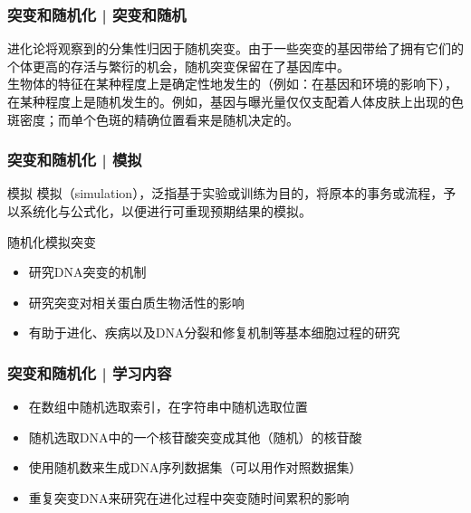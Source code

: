 \begin{frame}
  \frametitle{突变和随机化 | 突变和随机}
  进化论将观察到的分集性归因于随机突变。由于一些突变的基因带给了拥有它们的个体更高的存活与繁衍的机会，随机突变保留在了基因库中。\\
  \vspace{1em}
  生物体的特征在某种程度上是确定性地发生的（例如：在基因和环境的影响下），在某种程度上是随机发生的。例如，基因与曝光量仅仅支配着人体皮肤上出现的色斑密度；而单个色斑的精确位置看来是随机决定的。
\end{frame}

\begin{frame}
  \frametitle{突变和随机化 | 模拟}
  \begin{block}{模拟}
    模拟（simulation），泛指基于实验或训练为目的，将原本的事务或流程，予以系统化与公式化，以便进行可重现预期结果的模拟。
  \end{block}
  \pause
  \begin{block}{随机化模拟突变}
    \begin{itemize}
      \item 研究DNA突变的机制
      \item 研究突变对相关蛋白质生物活性的影响
      \item 有助于进化、疾病以及DNA分裂和修复机制等基本细胞过程的研究
    \end{itemize}
  \end{block}
\end{frame}

\begin{frame}
  \frametitle{突变和随机化 | 学习内容}
  \begin{itemize}
    \item 在数组中随机选取索引，在字符串中随机选取位置
    \item 随机选取DNA中的一个核苷酸突变成其他（随机）的核苷酸
    \item 使用随机数来生成DNA序列数据集（可以用作对照数据集）
    \item 重复突变DNA来研究在进化过程中突变随时间累积的影响
  \end{itemize}
\end{frame}

